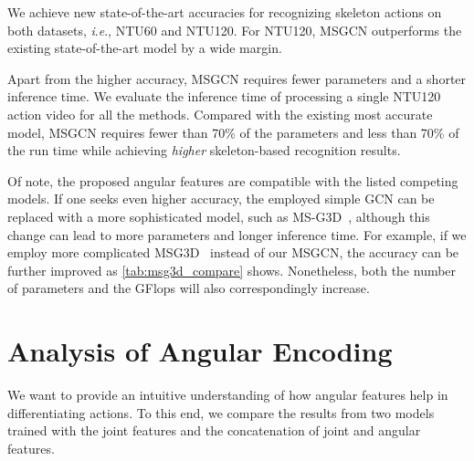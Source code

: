 \documentclass[journal,comsoc]{IEEEtran}
\newcommand{\ie}{\textit{i}.\textit{e}.,}
\def\ourmodel{MSGCN}
\begin{document}
We achieve new state-of-the-art accuracies for recognizing skeleton actions on both datasets, \ie{} NTU60 and NTU120. For NTU120, \ourmodel{} outperforms the existing state-of-the-art model by a wide margin. 

Apart from the higher accuracy, \ourmodel{} requires fewer parameters and a shorter inference time. We evaluate the inference time of processing a single NTU120 action video for all the methods. Compared with the existing most accurate model, \ourmodel{} requires fewer than 70\% of the parameters and less than 70\% of the run time while achieving \emph{higher} skeleton-based recognition results.  

Of note, the proposed angular features are compatible with the listed competing models. If one seeks even higher accuracy, the employed simple GCN can be replaced with a more sophisticated model, such as MS-G3D~\cite{liu2020disentangling}, although this change can lead to more parameters and longer inference time. For example, if we employ more complicated MSG3D~\cite{liu2020disentangling} instead of our MSGCN, the accuracy can be further improved as \autoref{tab:msg3d_compare} shows. Nonetheless, both the number of parameters and the GFlops will also correspondingly increase. 


\section{Analysis of Angular Encoding}
We want to provide an intuitive understanding of how angular features help in differentiating actions. To this end, we compare the results from two models trained with the joint features and the concatenation of joint and angular features. 
\end{document}
